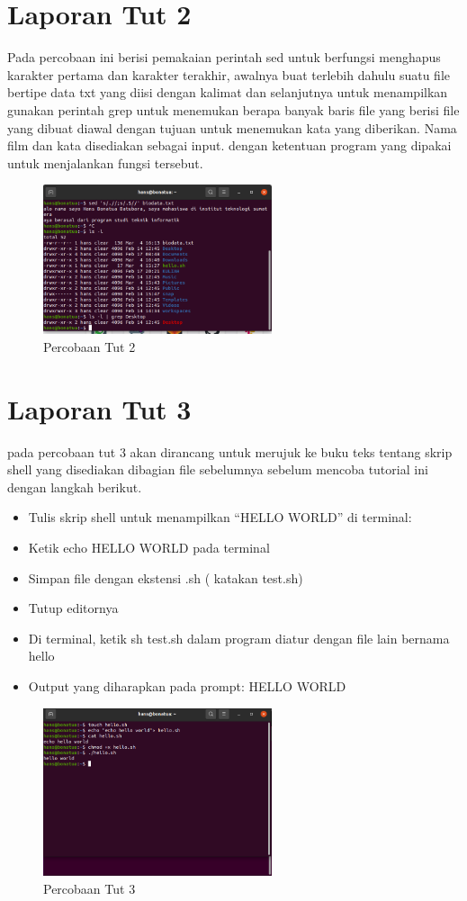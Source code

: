 \documentclass[11pt,a4paper]{article}
\begin{document}
\section{Laporan Tut 2}
Pada percobaan ini berisi pemakaian perintah sed untuk berfungsi menghapus karakter pertama dan karakter terakhir, awalnya buat terlebih dahulu suatu file bertipe data txt yang diisi dengan kalimat 
dan selanjutnya untuk menampilkan gunakan perintah grep untuk menemukan berapa banyak baris file yang berisi file yang dibuat diawal dengan tujuan untuk menemukan 
kata yang diberikan. Nama film dan kata disediakan sebagai input. dengan ketentuan program yang dipakai untuk menjalankan fungsi tersebut.
    \begin{figure}[h]
        \centering
        \includegraphics[width=0.6\textwidth]{Figure/tut2.png}
        \caption{Percobaan Tut 2}
    \end{figure}
\newpage
\section{Laporan Tut 3}
pada percobaan tut 3 akan dirancang untuk merujuk ke buku teks tentang skrip shell yang disediakan dibagian file sebelumnya sebelum mencoba
tutorial ini dengan langkah berikut.
\begin{itemize}
    \item Tulis skrip shell untuk menampilkan “HELLO WORLD” di terminal:
    \item Ketik echo HELLO WORLD pada terminal
    \item Simpan file dengan ekstensi .sh ( katakan test.sh)
    \item Tutup editornya
    \item Di terminal, ketik sh test.sh dalam program diatur dengan file lain bernama hello
    \item Output yang diharapkan pada prompt: HELLO WORLD
\end{itemize}
\begin{figure}[h]
    \centering
    \includegraphics[width=0.6\textwidth]{Figure/tut3.png}
    \caption{Percobaan Tut 3}
\end{figure}
\end{document}
